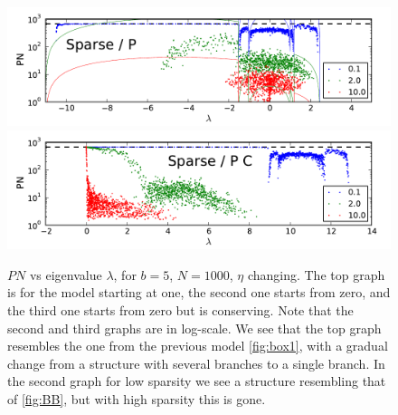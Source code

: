\documentclass[onecolumn,fleqn,longbibliography]{revtex4}
\begin{document}
\begin{figure}[H]
    \includegraphics{pta_exp_regular}\\
    \includegraphics{pta_exp_cons}\\
    \caption{$PN$ vs eigenvalue $\lambda$, for $b=5$, $N=1000$, $\eta$ changing. 
    The top graph is for the model starting at one, the second one starts from zero,
    and the third one starts from zero but is conserving.
    Note that the second and third graphs are in log-scale. We see that the top graph
    resembles the one from the previous model \autoref{fig:box1}, with 
    a gradual change from a structure with several branches to a single branch.
    In the second graph for low sparsity we see a structure 
    resembling that of \autoref{fig:BB}, but with high sparsity this is gone.}
    \label{fig:exp}
\end{figure}



\end{document}
